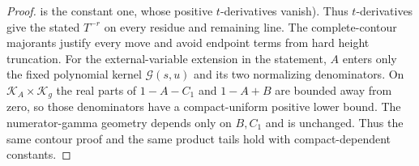 \begin{proof}
is the constant one, whose positive $t$-derivatives vanish).  Thus
$t$-derivatives give the stated $T^{-r}$ on every residue and remaining
line.  The complete-contour majorants justify every move and avoid endpoint
terms from hard height truncation.
For the external-variable extension in the statement, $A$ enters only the
fixed polynomial kernel $\mathcal G(s,u)$ and its two normalizing
denominators.  On $\mathscr K_A\times\mathscr K_g$ the real parts of
$1-A-C_1$ and $1-A+B$ are bounded away from zero, so those denominators have
a compact-uniform positive lower bound.  The numerator-gamma geometry
depends only on $B,C_1$ and is unchanged.  Thus the same contour proof and
the same product tails hold with compact-dependent constants.
\end{proof}
